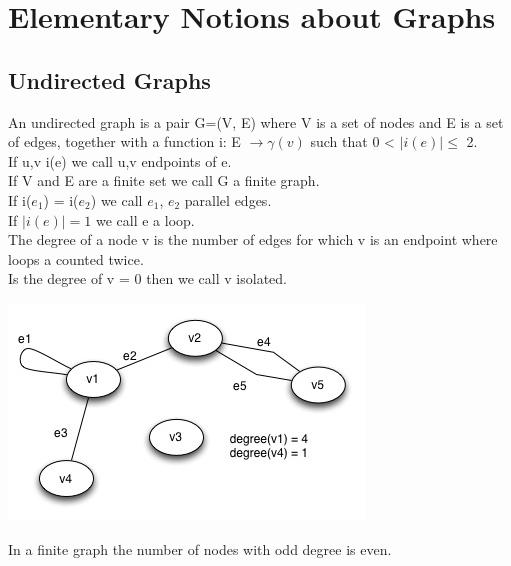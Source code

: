 \chapter{Elementary Notions about Graphs}

\begin{descr}
\end{descr}

\section{Undirected Graphs}
\begin{definition}
	An undirected graph is a pair G=(V, E) where V is a set of nodes and E is a set of edges, together with a function i: E $\rightarrow \gamma(v)$ such that 0 < $\mid i(e) \mid  \le $ 2.
\\
If u,v i(e) we call u,v endpoints of e. \\
If V and E are a finite set we call G a finite graph. \\
If i($e{_1}$) =  i($e{_2}$) we call  $e{_1}$, $e{_2}$ parallel edges.\\
If $\mid i(e) \mid = 1$ we call e a loop. \\
The degree of a node v is the number of edges for which v is an endpoint where loops a counted twice.\\
Is the degree of v = 0 then we call v isolated.
\end{definition}

\begin{example*}
\includegraphics{diagrams/Chapter1_Example1.jpg} \\
\end{example*}

\begin{lemma}
    In a finite graph the number of nodes with odd degree is even.
\end{lemma}


